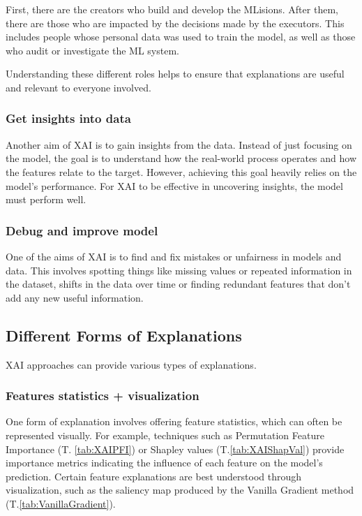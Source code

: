 First, there are the creators who build and develop the MLisions. After them, there are those who are impacted by the decisions made by the executors. This includes people whose personal data was used to train the model, as well as those who audit or investigate the ML system.

Understanding these different roles helps to ensure that explanations are useful and relevant to everyone involved.

\subsubsection*{Get insights into data}
Another aim of XAI is to gain insights from the data. Instead of just focusing on the model, the goal is to understand how the real-world process operates and how the features relate to the target. 
However, achieving this goal heavily relies on the model's performance. For XAI to be effective in uncovering insights, the model must perform well.\cite{freiesleben2022scientific}

\subsubsection*{Debug and improve model}
One of the aims of XAI is to find and fix mistakes or unfairness in models and data. This involves spotting things like missing values or repeated information in the dataset, shifts in the data over time or finding redundant features that don't add any new useful information.\cite{hassija2024interpreting,InterpretableToWhom}

\subsection{Different Forms of Explanations}
XAI approaches can provide various types of explanations.

\subsubsection*{Features statistics + visualization}
One form of explanation involves offering feature statistics, which can often be represented visually. For example, techniques such as Permutation Feature Importance (T. \ref{tab:XAIPFI}) or Shapley values (T.\ref{tab:XAIShapVal}) provide importance metrics indicating the influence of each feature on the model's prediction. Certain feature explanations are best understood through visualization, such as the saliency map produced by the Vanilla Gradient method (T.\ref{tab:VanillaGradient}).

